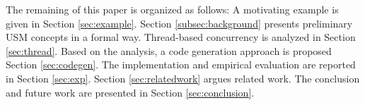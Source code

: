 


The remaining of this paper is organized as follows: A motivating example is given in Section \ref{sec:example}. Section \ref{subsec:background} presents preliminary USM concepts in a formal way. Thread-based concurrency is analyzed in Section \ref{sec:thread}. Based on the analysis, a code generation approach is proposed Section \ref{sec:codegen}. The implementation and empirical evaluation are reported in Section \ref{sec:exp}. Section \ref{sec:relatedwork} argues related work. The conclusion and future work are presented in Section \ref{sec:conclusion}.